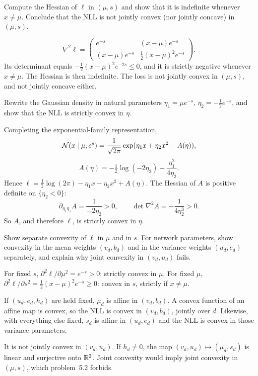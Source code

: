 \begin{hwqbox}
Compute the Hessian of $\ell$ in $(\mu,s)$ and show that it is indefinite whenever $x\ne\mu$. Conclude that the NLL is not jointly convex (nor jointly concave) in $(\mu,s)$.
\end{hwqbox}
\begin{hwsolbox}
\[
\nabla^2\ell=\begin{pmatrix}
e^{-s} & (x-\mu)e^{-s}\\
(x-\mu)e^{-s} & \tfrac12(x-\mu)^2 e^{-s}
\end{pmatrix}.
\]
Its determinant equals $-\tfrac12(x-\mu)^2 e^{-2s}\le 0$, and it is strictly negative whenever $x\ne\mu$. The Hessian is then indefinite. The loss is not jointly convex in $(\mu,s)$, and not jointly concave either.
\end{hwsolbox}

\begin{hwqbox}
Rewrite the Gaussian density in natural parameters $\eta_1=\mu e^{-s}$, $\eta_2=-\tfrac12 e^{-s}$, and show that the NLL is strictly convex in $\eta$.
\end{hwqbox}
\begin{hwsolbox}
Completing the exponential-family representation,
\[
\mathcal{N}(x\mid\mu,e^s)=\frac{1}{\sqrt{2\pi}}\exp(\eta_1 x+\eta_2 x^2-A(\eta)),
\]
\[
A(\eta)=-\tfrac12\log(-2\eta_2)-\frac{\eta_1^2}{4\eta_2}.
\]
Hence $\ell=\tfrac12\log(2\pi)-\eta_1 x-\eta_2 x^2+A(\eta)$. The Hessian of $A$ is positive definite on $\{\eta_2<0\}$:
\[
\partial_{\eta_1\eta_1}A=\frac{1}{-2\eta_2}>0,\qquad
\det\nabla^2 A=-\frac{1}{4\eta_2^3}>0.
\]
So $A$, and therefore $\ell$, is strictly convex in $\eta$.
\end{hwsolbox}

\begin{hwqbox}
Show separate convexity of $\ell$ in $\mu$ and in $s$. For network parameters, show convexity in the mean weights $(v_d,b_d)$ and in the variance weights $(u_d,e_d)$ separately, and explain why joint convexity in $(v_d,u_d)$ fails.
\end{hwqbox}
\begin{hwsolbox}
For fixed $s$, $\partial^2\ell/\partial\mu^2=e^{-s}>0$: strictly convex in $\mu$. For fixed $\mu$, $\partial^2\ell/\partial s^2=\tfrac12(x-\mu)^2 e^{-s}\ge 0$: convex in $s$, strictly if $x\ne\mu$.

If $(u_d,e_d,h_d)$ are held fixed, $\mu_d$ is affine in $(v_d,b_d)$. A convex function of an affine map is convex, so the NLL is convex in $(v_d,b_d)$, jointly over $d$. Likewise, with everything else fixed, $s_d$ is affine in $(u_d,e_d)$ and the NLL is convex in those variance parameters.

It is not jointly convex in $(v_d,u_d)$. If $h_d\ne 0$, the map $(v_d,u_d)\mapsto(\mu_d,s_d)$ is linear and surjective onto $\mathbb{R}^2$. Joint convexity would imply joint convexity in $(\mu,s)$, which problem~5.2 forbids.
\end{hwsolbox}

